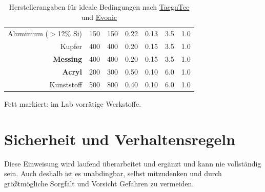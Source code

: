 \documentclass{\basedir/fablab-document}
\begin{document}
\begin{table}
\begin{tabular}{rcccccc}
	Aluminium	($>$12\% Si)			& 150	 	& 150  	& 0.22 	& 0.13	& 3.5 	& 1.0 	\\
	Kupfer											& 400	 	& 400  	& 0.20 	& 0.15	& 3.5 	& 1.0 	\\
	\textbf{Messing}											& 400	 	& 400  	& 0.20 	& 0.15	& 3.5 	& 1.0 	\\
	\textbf{Acryl}												& 200	 	& 300 	& 0.50 	& 0.10	& 6.0 	& 1.0 	\\
	Kunststoff										& 500	 	& 800 	& 0.40 	& 0.10	& 6.0 	& 1.0 	\\
\end{tabular}
\caption{Herstellerangaben für ideale Bedingungen nach \href{http://www.taegutec.com/Ustyles/DownloadFiles/I_Grades_en.pdf}{TaeguTec} und \href{http://www.roehmschweiz.ch/fileadmin/Roehm/PDF_Plexiglas/311-1_Bearbeiten_von_PLEXIGLAS_de.pdf}{Evonic}}
Fett markiert: im Lab vorrätige Werkstoffe.
\end{table}


\newpage
\section{Sicherheit und Verhaltensregeln}

Diese Einweisung wird laufend überarbeitet und ergänzt und kann nie vollständig sein. Auch deshalb ist es unabdingbar, selbst mitzudenken und durch größtmögliche Sorgfalt und Vorsicht Gefahren zu vermeiden.
\end{document}

